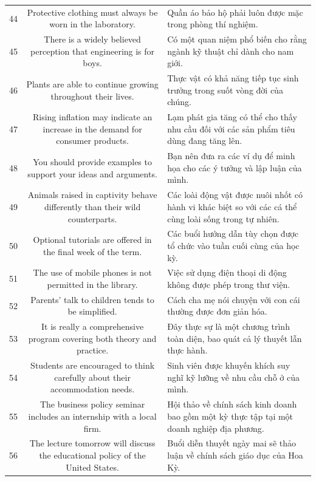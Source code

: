 \documentclass[11pt,a4paper]{article}
\begin{document}
\begin{longtable}{N S M}
44 & Protective clothing must always be worn in the laboratory. & Quần áo bảo hộ phải luôn được mặc trong phòng thí nghiệm. \\
45 & There is a widely believed perception that engineering is for boys. & Có một quan niệm phổ biến cho rằng ngành kỹ thuật chỉ dành cho nam giới. \\
46 & Plants are able to continue growing throughout their lives. & Thực vật có khả năng tiếp tục sinh trưởng trong suốt vòng đời của chúng. \\
47 & Rising inflation may indicate an increase in the demand for consumer products. & Lạm phát gia tăng có thể cho thấy nhu cầu đối với các sản phẩm tiêu dùng đang tăng lên. \\
48 & You should provide examples to support your ideas and arguments. & Bạn nên đưa ra các ví dụ để minh họa cho các ý tưởng và lập luận của mình. \\
49 & Animals raised in captivity behave differently than their wild counterparts. & Các loài động vật được nuôi nhốt có hành vi khác biệt so với các cá thể cùng loài sống trong tự nhiên. \\
50 & Optional tutorials are offered in the final week of the term. & Các buổi hướng dẫn tùy chọn được tổ chức vào tuần cuối cùng của học kỳ. \\
51 & The use of mobile phones is not permitted in the library. & Việc sử dụng điện thoại di động không được phép trong thư viện. \\
52 & Parents' talk to children tends to be simplified. & Cách cha mẹ nói chuyện với con cái thường được đơn giản hóa. \\
53 & It is really a comprehensive program covering both theory and practice. & Đây thực sự là một chương trình toàn diện, bao quát cả lý thuyết lẫn thực hành. \\
54 & Students are encouraged to think carefully about their accommodation needs. & Sinh viên được khuyến khích suy nghĩ kỹ lưỡng về nhu cầu chỗ ở của mình. \\
55 & The business policy seminar includes an internship with a local firm. & Hội thảo về chính sách kinh doanh bao gồm một kỳ thực tập tại một doanh nghiệp địa phương. \\
56 & The lecture tomorrow will discuss the educational policy of the United States. & Buổi diễn thuyết ngày mai sẽ thảo luận về chính sách giáo dục của Hoa Kỳ. \\

\end{longtable}
\end{document}
